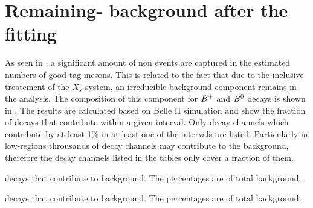 \chapter{Remaining-\texorpdfstring{\BB}{BB} background after the \texorpdfstring{\Mbc}{Mbc} fitting}\label{sec:appendix_remaining_bb}

As seen in ,
a significant amount of non \BtoXsgamma events are captured in the estimated numbers of good tag-\B mesons.
This is related to the fact that due to the inclusive treatement of the $X_s$ system, 
an irreducible background component remains in the analysis.
The composition of this component for $B^+$ and $B^0$ decays is shown in .
The results are calculated based on Belle II simulation and show the fraction of \B decays that contribute within a given \EB interval.
Only decay channels which contribute by at least 1\% in at least one of the \EB intervals are listed.
Particularly in low-\EB regions throusands of decay channels may contribute to the background, therefore the decay channels listed in the tables only cover a fraction of them.
\begin{table}[htbp!]
    \caption{\label{tab:leftover_bz}
    \Bz decays that contribute to background. 
    The percentages are of total \Bz background.}
    
\end{table}
\begin{table}[htbp!]
    \caption{\label{tab:leftover_bp}
    \Bp decays that contribute to background. 
    The percentages are of total \Bp background.}
    
\end{table}


